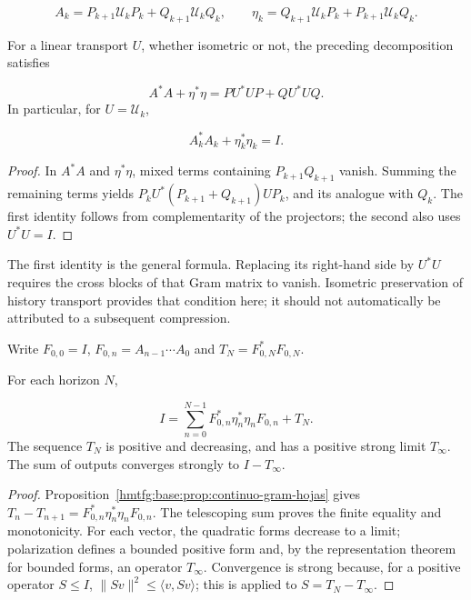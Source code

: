 \[
A_k=P_{k+1}\mathcal U_kP_k+Q_{k+1}\mathcal U_kQ_k,
\qquad
\eta_k=Q_{k+1}\mathcal U_kP_k+P_{k+1}\mathcal U_kQ_k.
\]
\begin{proposition}
\label{hmtfg:base:prop:continuo-gram-hojas}
For a linear transport \(U\), whether isometric or not, the preceding decomposition satisfies

\[
A^*A+\eta^*\eta=PU^*UP+QU^*UQ.
\]
In particular, for \(U=\mathcal U_k\),

\[
A_k^*A_k+\eta_k^*\eta_k=I.
\]
\end{proposition}
\begin{proof}
In \(A^*A\) and \(\eta^*\eta\), mixed terms containing \(P_{k+1}Q_{k+1}\) vanish. Summing the remaining terms yields \(P_kU^*(P_{k+1}+Q_{k+1})UP_k\), and its analogue with \(Q_k\). The first identity follows from complementarity of the projectors; the second also uses \(U^*U=I\).
\end{proof}

The first identity is the general formula. Replacing its right-hand side by \(U^*U\) requires the cross blocks of that Gram matrix to vanish. Isometric preservation of history transport provides that condition here; it should not automatically be attributed to a subsequent compression.

Write \(F_{0,0}=I\), \(F_{0,n}=A_{n-1}\cdots A_0\) and \(T_N=F_{0,N}^*F_{0,N}\).

\begin{theorem}
\label{hmtfg:base:thm:continuo-descomposicion-terminal}
For each horizon \(N\),

\[
I=\sum_{n=0}^{N-1}
F_{0,n}^*\eta_n^*\eta_nF_{0,n}+T_N.
\]
The sequence \(T_N\) is positive and decreasing, and has a positive strong limit \(T_\infty\). The sum of outputs converges strongly to \(I-T_\infty\).
\end{theorem}
\begin{proof}
Proposition~\ref{hmtfg:base:prop:continuo-gram-hojas} gives \(T_n-T_{n+1}=F_{0,n}^*\eta_n^*\eta_nF_{0,n}\). The telescoping sum proves the finite equality and monotonicity. For each vector, the quadratic forms decrease to a limit; polarization defines a bounded positive form and, by the representation theorem for bounded forms, an operator \(T_\infty\). Convergence is strong because, for a positive operator \(S\leq I\), \(\|Sv\|^2\leq\langle v,Sv\rangle\); this is applied to \(S=T_N-T_\infty\).
\end{proof}

